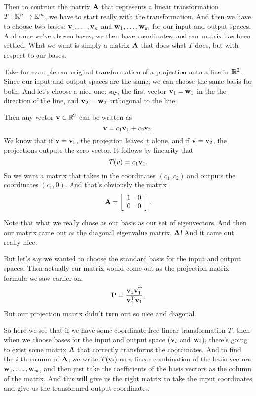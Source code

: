 Then to contruct the matrix $\boldsymbol{\mathbf{A}}$ that represents a linear transformation $T:\mathbb{R}^n\to\mathbb{R}^m$, we have to start really with the transformation. And then we have to choose two bases: $\boldsymbol{\mathbf{v}}_1, \ldots, \boldsymbol{\mathbf{v}}_n$ and $\boldsymbol{\mathbf{w}}_1, \ldots, \boldsymbol{\mathbf{w}}_m$ for our input and output spaces. And once we've chosen bases, we then have coordinates, and our matrix has been settled. What we want is simply a matrix $\boldsymbol{\mathbf{A}}$ that does what $T$ does, but with respect to our bases. 

\begin{example}
  Take for example our original transformation of a projection onto a line in $\mathbb{R}^2$. Since our input and output spaces are the same, we can choose the same basis for both. And let's choose a nice one: say, the first vector $\boldsymbol{\mathbf{v}}_1 = \boldsymbol{\mathbf{w}}_1$ in the the direction of the line, and $\boldsymbol{\mathbf{v}}_2=\boldsymbol{\mathbf{w}}_2$ orthogonal to the line.

Then any vector $\boldsymbol{\mathbf{v}} \in \mathbb{R}^2$ can be written as 
\[ \boldsymbol{\mathbf{v}} = c_1\boldsymbol{\mathbf{v}}_1 + c_2 \boldsymbol{\mathbf{v}}_2. \]
We know that if $\boldsymbol{\mathbf{v}}=\boldsymbol{\mathbf{v}}_1$, the projection leaves it alone, and if $\boldsymbol{\mathbf{v}}=\boldsymbol{\mathbf{v}}_2$, the projections outputs the zero vector. It follows by linearity that 
\[ T(v) = c_1\boldsymbol{\mathbf{v}}_1. \]
So we want a matrix that takes in the coordinates $(c_1,c_2)$ and outputs the coordinates $(c_1, 0)$. And that's obviously the matrix
\[ \boldsymbol{\mathbf{A}} = \left[ \begin{array}{rrrrrrrrrrrrrrrrrrrrrrrrr} 1&0\\0&0\\ \end{array} \right]. \]

Note that what we really chose as our basis as our set of eigenvectors. And then our matrix came out as the diagonal eigenvalue matrix, $\boldsymbol{\mathbf{\Lambda}}$! And it came out really nice.

But let's say we wanted to choose the standard basis for the input and output spaces. Then actually our matrix would come out as the projection matrix formula we saw earlier on:
\[ \boldsymbol{\mathbf{P}} = \frac{\boldsymbol{\mathbf{v}}_1\boldsymbol{\mathbf{v}}_1^\mathrm{T}}{\boldsymbol{\mathbf{v}}_1^\mathrm{T}\boldsymbol{\mathbf{v}}_1}. \]
But our projection matrix didn't turn out so nice and diagonal. 
\end{example}

So here we see that if we have some coordinate-free linear transformation $T$, then when we choose bases for the input and output space ($\boldsymbol{\mathbf{v}}_i$ and $\boldsymbol{\mathbf{w}}_i$), there's going to exist some matrix $\boldsymbol{\mathbf{A}}$ that correctly transforms the coordinates. And to find the $i$-th column of $\boldsymbol{\mathbf{A}}$, we write $T(\boldsymbol{\mathbf{v}}_i)$ as a linear combination of the basis vectors $\boldsymbol{\mathbf{w}}_1, \ldots, \boldsymbol{\mathbf{w}}_m$, and then just take the coefficients of the basis vectors as the column of the matrix. And this will give us the right matrix to take the input coordinates and give us the transformed output coordinates.

